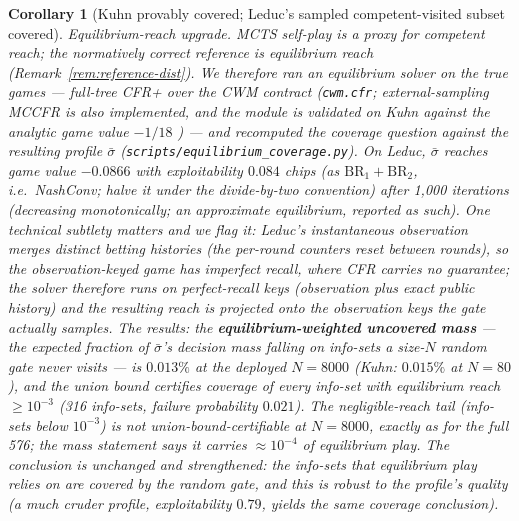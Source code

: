 \documentclass[11pt]{article}
\newtheorem{corollary}{Corollary}
\theoremstyle{remark}
\begin{document}
\begin{corollary}[Kuhn provably covered; Leduc's sampled competent-visited subset covered]
\emph{Equilibrium-reach upgrade.} MCTS self-play is a proxy for competent reach; the normatively correct reference is equilibrium reach (Remark~\ref{rem:reference-dist}). We therefore ran an equilibrium solver on the true games --- full-tree CFR+ over the CWM contract (\texttt{cwm.cfr}; external-sampling MCCFR is also implemented, and the module is validated on Kuhn against the analytic game value $-1/18$ \citep{kuhn1950poker}) --- and recomputed the coverage question against the resulting profile $\bar\sigma$ (\texttt{scripts/equilibrium\_coverage.py}). On Leduc, $\bar\sigma$ reaches game value $-0.0866$ with exploitability $0.084$ chips (as $\mathrm{BR}_1 + \mathrm{BR}_2$, i.e.\ NashConv; halve it under the divide-by-two convention) after 1{,}000 iterations (decreasing monotonically; an approximate equilibrium, reported as such). One technical subtlety matters and we flag it: Leduc's \emph{instantaneous} observation merges distinct betting histories (the per-round counters reset between rounds), so the observation-keyed game has imperfect recall, where CFR carries no guarantee; the solver therefore runs on perfect-recall keys (observation plus exact public history) and the resulting reach is projected onto the observation keys the gate actually samples. The results: the \textbf{equilibrium-weighted uncovered mass} --- the expected fraction of $\bar\sigma$'s decision mass falling on info-sets a size-$N$ random gate never visits --- is $0.013\%$ at the deployed $N=8000$ (Kuhn: $0.015\%$ at $N=80$), and the union bound certifies coverage of every info-set with equilibrium reach $\geq 10^{-3}$ (316 info-sets, failure probability $0.021$). The negligible-reach tail (info-sets below $10^{-3}$) is not union-bound-certifiable at $N=8000$, exactly as for the full 576; the mass statement says it carries $\approx 10^{-4}$ of equilibrium play. The conclusion is unchanged and strengthened: the info-sets that \emph{equilibrium} play relies on are covered by the random gate, and this is robust to the profile's quality (a much cruder profile, exploitability $0.79$, yields the same coverage conclusion).
\end{corollary}
\end{document}
